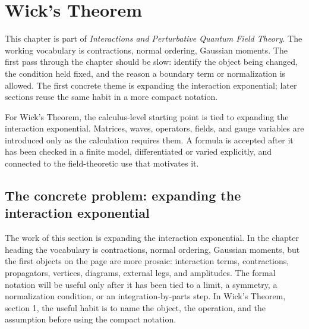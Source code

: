 \chapter{Wick's Theorem}


This chapter is part of \emph{Interactions and Perturbative Quantum Field Theory}.  The working vocabulary is contractions, normal ordering, Gaussian moments.  The first pass through the chapter should be slow: identify the object being changed, the condition held fixed, and the reason a boundary term or normalization is allowed.  The first concrete theme is expanding the interaction exponential; later sections reuse the same habit in a more compact notation.

For Wick's Theorem, the calculus-level starting point is tied to expanding the interaction exponential.  Matrices, waves, operators, fields, and gauge variables are introduced only as the calculation requires them.  A formula is accepted after it has been checked in a finite model, differentiated or varied explicitly, and connected to the field-theoretic use that motivates it.

\section{The concrete problem: expanding the interaction exponential}













The work of this section is expanding the interaction exponential.  In the chapter heading the vocabulary is contractions, normal ordering, Gaussian moments, but the first objects on the page are more prosaic: interaction terms, contractions, propagators, vertices, diagrams, external legs, and amplitudes.  The formal notation will be useful only after it has been tied to a limit, a symmetry, a normalization condition, or an integration-by-parts step.  In Wick's Theorem, section 1, the useful habit is to name the object, the operation, and the assumption before using the compact notation.

